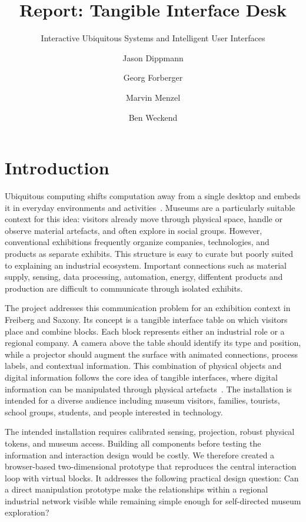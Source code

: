 \documentclass[sigconf,nonacm]{acmart}
\title{Report: Tangible Interface Desk}
\subtitle{Interactive Ubiquitous Systems and Intelligent User Interfaces}
\author{Jason Dippmann}
\affiliation{%
  \institution{TU Bergakademie Freiberg}
  \city{Freiberg}
  \country{Germany}
}
\author{Georg Forberger}
\affiliation{%
  \institution{TU Bergakademie Freiberg}
  \city{Freiberg}
  \country{Germany}
}
\author{Marvin Menzel}
\affiliation{%
  \institution{TU Bergakademie Freiberg}
  \city{Freiberg}
  \country{Germany}
}
\author{Ben Weckend}
\affiliation{%
  \institution{TU Bergakademie Freiberg}
  \city{Freiberg}
  \country{Germany}
}
\begin{document}
\maketitle

\section{Introduction}

Ubiquitous computing shifts computation away from a single desktop and embeds it in everyday environments and activities~\cite{weiser1991}. Museums are a particularly suitable context for this idea: visitors already move through physical space, handle or observe material artefacts, and often explore in social groups. However, conventional exhibitions frequently organize companies, technologies, and products as separate exhibits. This structure is easy to curate but poorly suited to explaining an industrial ecosystem. Important connections such as material supply, sensing, data processing, automation, energy, diffentent products and production are difficult to communicate through isolated exhibits.

The project addresses this communication problem for an exhibition context in Freiberg and Saxony. Its concept is a tangible interface table on which visitors place and combine blocks. Each block represents either an industrial role or a regional company. A camera above the table should identify its type and position, while a projector should augment the surface with animated connections, process labels, and contextual information. This combination of physical objects and digital information follows the core idea of tangible interfaces, where digital information can be manipulated through physical artefacts~\cite{ishii1997}. The installation is intended for a diverse audience including museum visitors, families, tourists, school groups, students, and people interested in technology.

The intended installation requires calibrated sensing, projection, robust physical tokens, and museum access. Building all components before testing the information and interaction design would be costly. We therefore created a browser-based two-dimensional prototype that reproduces the central interaction loop with virtual blocks. It addresses the following practical design question: Can a direct manipulation prototype make the relationships within a regional industrial network visible while remaining simple enough for self-directed museum exploration?
\end{document}
